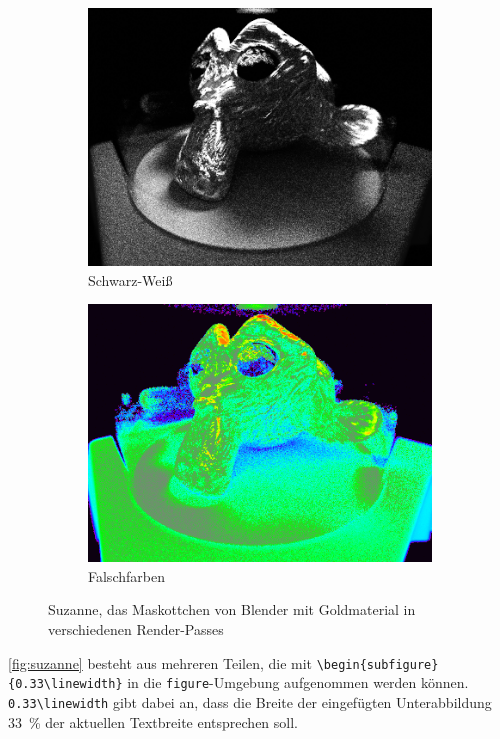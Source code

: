 \begin{figure}[!b]
\begin{subfigure}{0.32\linewidth}
				\includegraphics[width=\linewidth]{Medien/suzanne-sw}
				\caption{Schwarz-Weiß}
			\end{subfigure}
			\hfill
			\begin{subfigure}{0.32\linewidth}
				\includegraphics[width=\linewidth]{Medien/suzanne-false-color}
				\caption{Falschfarben}
			\end{subfigure}
			\caption[Suzanne in verschiedenen Renderpasses]{Suzanne, das Maskottchen von Blender mit Goldmaterial in verschiedenen Render-Passes}
			\label{fig:suzanne}
		\end{figure}
		\autoref{fig:suzanne} besteht aus mehreren Teilen, die mit  \lstinline[language=thesis-latexbeispiel]|\begin{subfigure}{0.33\linewidth}| in die \lstinline[language=thesis-latexbeispiel]|figure|-Umgebung aufgenommen werden können. 
		\lstinline[language=thesis-latexbeispiel]|0.33\linewidth| gibt dabei an, dass die Breite der eingefügten Unterabbildung \SI{33}{\percent} der aktuellen Textbreite entsprechen soll.
		
